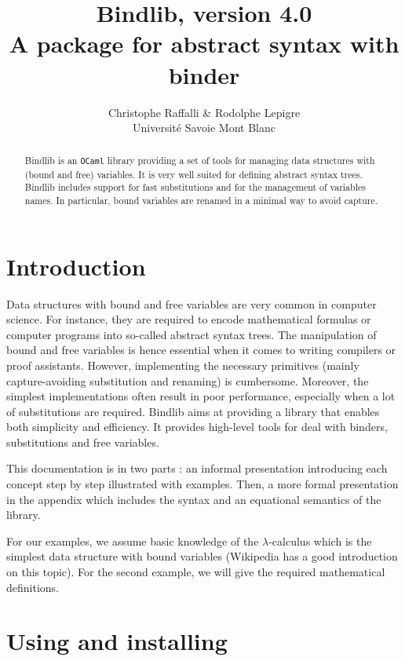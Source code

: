\documentclass[11pt]{article}
\title{
  Bindlib, version 4.0 \\
  A package for abstract syntax with binder
}
\author{
  Christophe Raffalli \& Rodolphe Lepigre \\
  Université Savoie Mont Blanc
}
\begin{document}
\maketitle

\vspace{1cm}
\begin{abstract}
  Bindlib is an \verb#OCaml# library providing a set of tools for managing
  data structures with (bound and free) variables. It is very well suited for
  defining abstract syntax trees.
  Bindlib includes support for fast substitutions and for the management of
  variables names. In particular, bound variables are renamed in a minimal
  way to avoid capture.
\end{abstract}
\vspace{1cm}

\tableofcontents

\section{Introduction}

Data structures with bound and free variables are very common in computer
science. For instance, they are required to encode mathematical formulas or
computer programs into so-called abstract syntax trees. The manipulation of
bound and free variables is hence essential when it comes to writing
compilers or proof assistants. However, implementing the necessary primitives
(mainly capture-avoiding substitution and renaming) is cumbersome. Moreover,
the simplest implementations often result in poor performance, especially
when a lot of substitutions are required. Bindlib aims at providing a library
that enables both simplicity and efficiency. It provides high-level tools for
deal with binders, substitutions and free variables.

This documentation is in two parts : an informal presentation
introducing each concept step by step illustrated with examples. Then,
a more formal presentation in the appendix which includes the syntax
and an equational semantics of the library.

For our examples, we assume basic knowledge of the $\lambda$-calculus
which is the simplest data structure with bound variables (Wikipedia
has a good introduction on this topic). For the second example, we
will give the required mathematical definitions.

\section{Using and installing}
\end{document}
